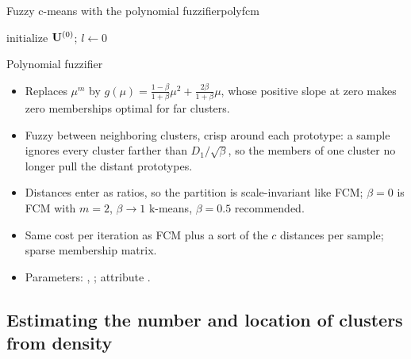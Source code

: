 \begin{algobox}{Fuzzy c-means with the polynomial fuzzifier}{polyfcm}
\begin{algorithm}[H]
initialize $\mathbf{U}^{(0)}$; $l\leftarrow0$\;
\end{algorithm}
\end{algobox}
\begin{summarybox}{Polynomial fuzzifier}
\begin{itemize}
  \item Replaces $\mu^m$ by $g(\mu)=\frac{1-\beta}{1+\beta}\mu^2+\frac{2\beta}{1+\beta}\mu$, whose positive slope at zero makes zero memberships optimal for far clusters.
  \item Fuzzy between neighboring clusters, crisp around each prototype: a sample ignores every cluster farther than $D_1/\sqrt\beta$, so the members of one cluster no longer pull the distant prototypes.
  \item Distances enter as ratios, so the partition is scale-invariant like FCM; $\beta=0$ is FCM with $m=2$, $\beta\to1$ k-means, $\beta=0.5$ recommended.
  \item Same cost per iteration as FCM plus a sort of the $c$ distances per sample; sparse membership matrix.
  \item Parameters: , ; attribute .
\end{itemize}
\end{summarybox}

\subsection{Estimating the number and location of clusters from density}\label{sec:part:density}

